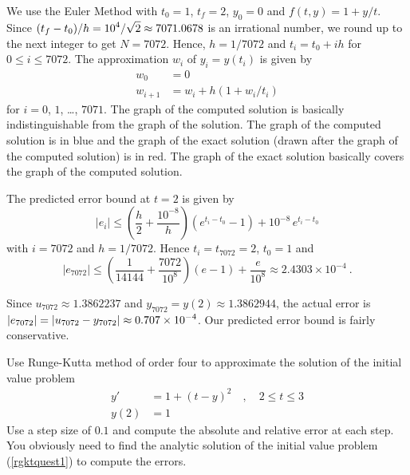 { We use the Euler Method with $t_0=1$, $t_f= 2$,
$y_0 = 0$ and $f(t,y) = 1 + y/t$.  Since
$\displaystyle (t_f-t_0)/h = 10^4/\sqrt{2} \approx 7071.0678$
is an irrational number, we round up to the next integer to get
$N = 7072$.   Hence, $h = 1/7072$ and $t_i = t_0 + ih$ for
$0\leq i \leq 7072$.  The approximation $w_i$ of $y_i = y(t_i)$ is
given by
\begin{align*}
w_0 & = 0 \\
w_{i+1} & = w_i + h(1 + w_i/t_i)
\end{align*}
for $i=0$, $1$, \ldots, $7071$.   The graph of the computed solution
is basically indistinguishable from the graph of the solution.
The graph of the computed solution is in blue and the graph of the
exact solution (drawn after the graph of the computed solution) is in
red.  The graph of the exact solution basically covers the graph of the
computed solution.

  The predicted error bound at $t=2$ is given by
\[
|e_i| \leq \left(\frac{h}{2} + \frac{10^{-8}}{h} \right)\left(
  e^{t_i-t_0} - 1 \right) + 10^{-8}\,e^{t_i-t_0}
\]
with $i=7072$ and $h=1/7072$.  Hence $t_i = t_{7072} = 2$, $t_0=1$ and
\[
|e_{7072}| \leq \left(\frac{1}{14144} + \frac{7072}{10^8} \right)
( e- 1) + \frac{e}{10^8} \approx 2.4303 \times 10^{-4} \ .
\]

Since $u_{7072} \approx 1.3862237$ and
$y_{7072} = y(2) \approx 1.3862944$, the actual error is
$\displaystyle |e_{7072}| = |u_{7072} - y_{7072}| \approx 0.707 \times 10^{-4}$.
Our predicted error bound is fairly conservative.
}

\begin{question}
Use Runge-Kutta method of order four to approximate the solution of
the initial value problem
\begin{equation}\label{rgktquest1}
\begin{split}
y' &= 1 + (t - y)^2    \quad , \quad  2 \leq t \leq 3 \\
y(2) &= 1
\end{split}
\end{equation}
Use a step size of $0.1$ and compute the absolute and relative error
at each step.  You obviously need to find the analytic solution of the
initial value problem (\ref{rgktquest1}) to compute the errors.
\end{question}

